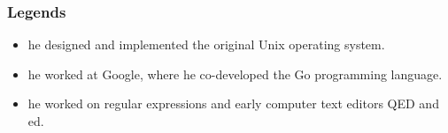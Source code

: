 \documentclass{../c-lecture}
\begin{document}
\begin{frame}
  \frametitle{Legends}
  \begin{itemize}
    \item he designed and implemented the original Unix operating system.
    \item he worked at Google, where he co-developed the Go programming language.
    \item he worked on regular expressions and early computer text editors QED and ed.
  \end{itemize}
\end{frame}
\end{document}
